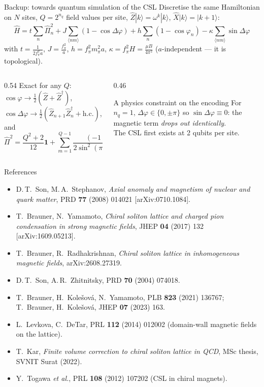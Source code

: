 \documentclass[aspectratio=169,10pt]{beamer}
\newcommand{\fpi}{f_\pi}
\newcommand{\mpi}{m_\pi}
\begin{document}
\begin{frame}{Backup: towards quantum simulation of the CSL}
Discretise the same Hamiltonian on $N$ sites, $Q=2^{n_q}$ field values per site,
$\hat Z|k\rangle=\omega^k|k\rangle$, $\hat X|k\rangle=|k{+}1\rangle$:
\[
 \hat H=t\sum_n\hat\Pi_n^2+J\sum_{\langle nm\rangle}(1-\cos\Delta\varphi)
 +h\sum_n(1-\cos\varphi_n)-\kappa\sum_{\langle nm\rangle}\sin\Delta\varphi
\]
with $t=\frac{1}{2\fpi^2a}$, $J=\frac{\fpi^2}{a}$, $h=\fpi^2\mpi^2a$,
$\kappa=\fpi^2H=\frac{\mu B}{4\pi^2}$ ($a$-independent --- it is topological).
\vspace{1mm}
\begin{columns}[T,onlytextwidth]
\begin{column}{0.54\textwidth}
Exact for any $Q$:
$\cos\varphi\to\frac12(\hat Z+\hat Z^\dagger)$,
$\cos\Delta\varphi\to\frac12(\hat Z_{n+1}\hat Z_n^\dagger+\text{h.c.})$, and
\[
 \hat\Pi^2=\frac{Q^2+2}{12}\bm{1}
 +\sum_{m=1}^{Q-1}\frac{(-1)^m}{2\sin^2(\pi m/Q)}\hat X^m
\]
\end{column}
\begin{column}{0.46\textwidth}
\begin{alertblock}{A physics constraint on the encoding}
For $n_q=1$, $\Delta\varphi\in\{0,\pm\pi\}$ so $\sin\Delta\varphi\equiv0$: the
magnetic term \emph{drops out identically}.\\[1mm]
\alert{The CSL first exists at 2 qubits per site.}
\end{alertblock}
\end{column}
\end{columns}
\end{frame}

\begin{frame}{References}
\footnotesize
\begin{itemize}
  \item D.\,T.~Son, M.\,A.~Stephanov, \emph{Axial anomaly and magnetism of
        nuclear and quark matter}, PRD \textbf{77} (2008) 014021
        [arXiv:0710.1084].
  \item T.~Brauner, N.~Yamamoto, \emph{Chiral soliton lattice and charged pion
        condensation in strong magnetic fields}, JHEP \textbf{04} (2017) 132
        [arXiv:1609.05213].
  \item T.~Brauner, R.~Radhakrishnan, \emph{Chiral soliton lattice in
        inhomogeneous magnetic fields}, arXiv:2608.27319.
  \item D.\,T.~Son, A.\,R.~Zhitnitsky, PRD \textbf{70} (2004) 074018.
  \item T.~Brauner, H.~Kole\v{s}ov\'a, N.~Yamamoto, PLB \textbf{823} (2021)
        136767; T.~Brauner, H.~Kole\v{s}ov\'a, JHEP \textbf{07} (2023) 163.
  \item L.~Levkova, C.~DeTar, PRL \textbf{112} (2014) 012002
        (domain-wall magnetic fields on the lattice).
  \item T.~Kar, \emph{Finite volume correction to chiral soliton lattice in
        QCD}, MSc thesis, SVNIT Surat (2022).
  \item Y.~Togawa \emph{et al.}, PRL \textbf{108} (2012) 107202
        (CSL in chiral magnets).
\end{itemize}
\end{frame}
\end{document}
